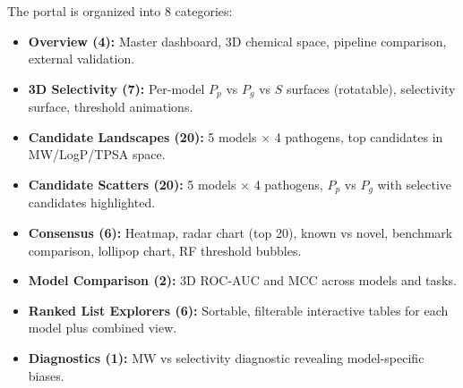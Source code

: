\documentclass{article}
\begin{document}
\noindent The portal is organized into 8 categories:
\begin{itemize}
\item \textbf{Overview (4):} Master dashboard, 3D chemical space, pipeline comparison, external validation.
\item \textbf{3D Selectivity (7):} Per-model $P_p$ vs $P_g$ vs $S$ surfaces (rotatable), selectivity surface, threshold animations.
\item \textbf{Candidate Landscapes (20):} 5 models $\times$ 4 pathogens, top candidates in MW/LogP/TPSA space.
\item \textbf{Candidate Scatters (20):} 5 models $\times$ 4 pathogens, $P_p$ vs $P_g$ with selective candidates highlighted.
\item \textbf{Consensus (6):} Heatmap, radar chart (top 20), known vs novel, benchmark comparison, lollipop chart, RF threshold bubbles.
\item \textbf{Model Comparison (2):} 3D ROC-AUC and MCC across models and tasks.
\item \textbf{Ranked List Explorers (6):} Sortable, filterable interactive tables for each model plus combined view.
\item \textbf{Diagnostics (1):} MW vs selectivity diagnostic revealing model-specific biases.
\end{itemize}
\end{document}
